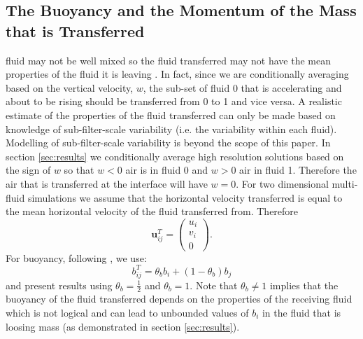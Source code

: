 \documentclass[draft]{agujournal2019}
\begin{document}
\subsection{The Buoyancy and the Momentum of the Mass that is Transferred \label{subsec:transferProperties}}

 fluid may not be well mixed so the fluid transferred
may not have the mean properties of the fluid it is leaving \cite<as was assumed by>{WM19}. In fact, 
{since we are conditionally averaging based on the vertical velocity, $w$, the sub-set of fluid 0 that is accelerating and about to be rising}
should be transferred from 0 to 1 and vice versa.
{A realistic estimate of the properties of the fluid transferred can only be made based on knowledge of sub-filter-scale variability (i.e. the variability within each fluid). Modelling of sub-filter-scale variability}
is beyond the scope of this paper.
%
In section \ref{sec:results}
we conditionally average high resolution solutions based on the sign
of $w$ so that $w<0$ air is in fluid 0 and $w>0$ air in fluid 1.
Therefore the air that is transferred at the interface will have $w=0$.
For two dimensional multi-fluid simulations we assume that the horizontal
velocity transferred is equal to the mean horizontal velocity of the
fluid transferred from. Therefore
\begin{equation}
\mathbf{u}_{ij}^{T}=\begin{pmatrix}u_{i}\\
v_{i}\\
0
\end{pmatrix}.
\end{equation}
For buoyancy, following , we use:
\begin{equation}
b_{ij}^{T}=\theta_{b}b_{i}+(1-\theta_{b})b_{j}
\end{equation}
and present results using $\theta_{b}=\frac{1}{2}$ and $\theta_{b}=1$.
Note that $\theta_{b}\ne1$ implies that the buoyancy of the fluid
transferred depends on the properties of the receiving fluid which
is not logical and can lead to unbounded values of $b_{i}$ in the
fluid that is loosing mass (as demonstrated in section \ref{sec:results}).
\end{document}
